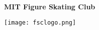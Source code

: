 \documentclass[12pt]{article}
\newcommand{\programnumber}[2]{{
  \vspace{0.07in}
  \textbf{#1}\\
  {\footnotesize #2}
}}
\begin{document}
\begin{multicols*}{2}
\begin{center}
\vspace*{1.5in}

\begin{Large}
{\bfseries
MIT Figure Skating Club
}
\end{Large}

\vspace{0.2in}

\begin{large}
{\bfseries
}
\end{large}

\vspace{0.7in}

\texttt{[image: fsclogo.png]}

\end{center}

\vfill\null
\columnbreak



\begin{center}



\end{center}
\end{multicols*}
\end{document}
